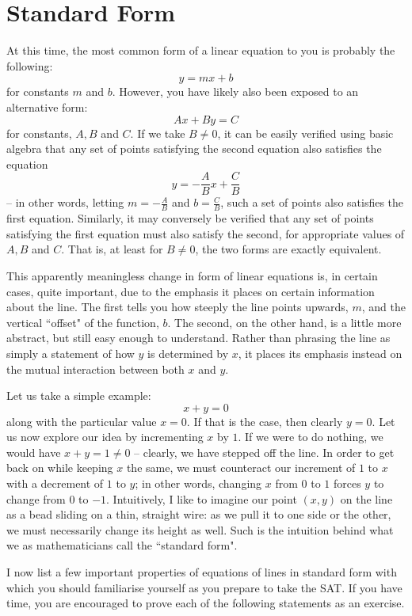 \documentclass{article}
\begin{document}
	\section*{Standard Form}
	At this time, the most common form of a linear equation to you is probably the following:
	\[y=mx+b\]
	for constants $m$ and $b$. However, you have likely also been exposed to an alternative form:
	\[Ax + By = C\]
	for constants, $A, B$ and $C$. If we take $B \neq 0$, it can be easily verified using basic algebra that any set of points satisfying the second equation also satisfies the equation
	\[y = -\frac{A}{B}x+\frac{C}{B}\]
	-- in other words, letting $m = -\frac{A}{B}$ and $b = \frac{C}{B}$, such a set of points also satisfies the first equation. Similarly, it may conversely be verified that any set of points satisfying the first equation must also satisfy the second, for appropriate values of $A, B$ and $C$. That is, at least for $B \neq 0$, the two forms are exactly equivalent.
	
	This apparently meaningless change in form of linear equations is, in certain cases, quite important, due to the emphasis it places on certain information about the line. The first tells you how steeply the line points upwards, $m$, and the vertical ``offset" of the function, $b$. The second, on the other hand, is a little more abstract, but still easy enough to understand. Rather than phrasing the line as simply a statement of how $y$ is determined by $x$, it places its emphasis instead on the mutual interaction between both $x$ and $y$.
	
	Let us take a simple example:
	\[x+y=0\]
	along with the particular value $x = 0$. If that is the case, then clearly $y = 0$. Let us now explore our idea by incrementing $x$ by $1$. If we were to do nothing, we would have $x + y = 1 \neq 0$ -- clearly, we have stepped off the line. In order to get back on while keeping $x$ the same, we must counteract our increment of $1$ to $x$ with a decrement of $1$ to $y$; in other words, changing $x$ from $0$ to $1$ forces $y$ to change from $0$ to $-1$. Intuitively, I like to imagine our point $(x, y)$ on the line as a bead sliding on a thin, straight wire: as we pull it to one side or the other, we must necessarily change its height as well. Such is the intuition behind what we as mathematicians call the ``standard form".
	
	I now list a few important properties of equations of lines in standard form with which you should familiarise yourself as you prepare to take the SAT. If you have time, you are encouraged to prove each of the following statements as an exercise.
	
\end{document}
